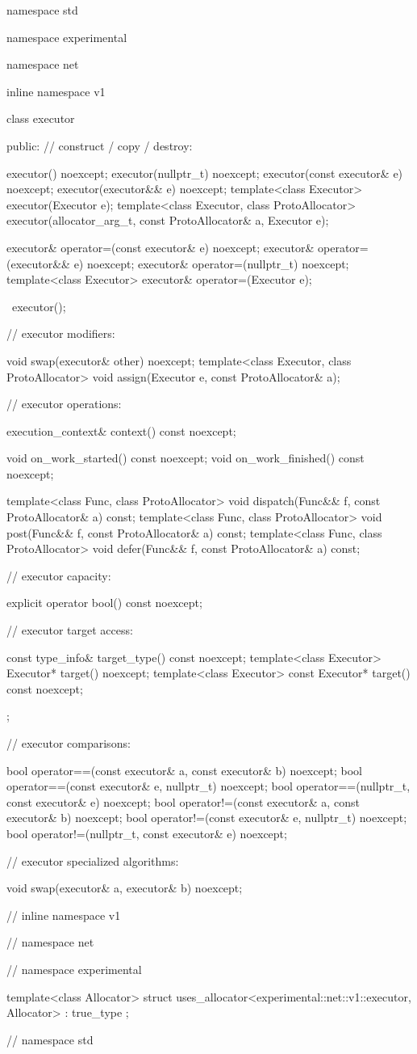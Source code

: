 \begin{codeblock}
namespace std {
namespace experimental {
namespace net {
inline namespace v1 {

  class executor
  {
  public:
    // construct / copy / destroy:

    executor() noexcept;
    executor(nullptr_t) noexcept;
    executor(const executor& e) noexcept;
    executor(executor&& e) noexcept;
    template<class Executor> executor(Executor e);
    template<class Executor, class ProtoAllocator>
      executor(allocator_arg_t, const ProtoAllocator& a, Executor e);

    executor& operator=(const executor& e) noexcept;
    executor& operator=(executor&& e) noexcept;
    executor& operator=(nullptr_t) noexcept;
    template<class Executor> executor& operator=(Executor e);

    ~executor();

    // executor modifiers:

    void swap(executor& other) noexcept;
    template<class Executor, class ProtoAllocator>
      void assign(Executor e, const ProtoAllocator& a);

    // executor operations:

    execution_context& context() const noexcept;

    void on_work_started() const noexcept;
    void on_work_finished() const noexcept;

    template<class Func, class ProtoAllocator>
      void dispatch(Func&& f, const ProtoAllocator& a) const;
    template<class Func, class ProtoAllocator>
      void post(Func&& f, const ProtoAllocator& a) const;
    template<class Func, class ProtoAllocator>
      void defer(Func&& f, const ProtoAllocator& a) const;

    // executor capacity:

    explicit operator bool() const noexcept;

    // executor target access:

    const type_info& target_type() const noexcept;
    template<class Executor> Executor* target() noexcept;
    template<class Executor> const Executor* target() const noexcept;
  };

  // executor comparisons:

  bool operator==(const executor& a, const executor& b) noexcept;
  bool operator==(const executor& e, nullptr_t) noexcept;
  bool operator==(nullptr_t, const executor& e) noexcept;
  bool operator!=(const executor& a, const executor& b) noexcept;
  bool operator!=(const executor& e, nullptr_t) noexcept;
  bool operator!=(nullptr_t, const executor& e) noexcept;

  // executor specialized algorithms:

  void swap(executor& a, executor& b) noexcept;

} // inline namespace v1
} // namespace net
} // namespace experimental

  template<class Allocator>
    struct uses_allocator<experimental::net::v1::executor, Allocator>
      : true_type {};

} // namespace std
\end{codeblock}

